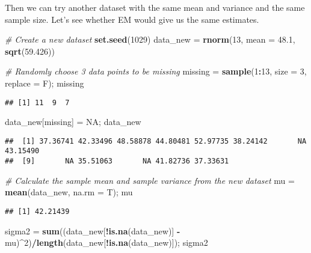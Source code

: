 \documentclass[]{article}
\newenvironment{Shaded}{\begin{snugshade}}{\end{snugshade}}
\newcommand{\CommentTok}[1]{\textcolor[rgb]{0.56,0.35,0.01}{\textit{#1}}}
\newcommand{\DataTypeTok}[1]{\textcolor[rgb]{0.13,0.29,0.53}{#1}}
\newcommand{\DecValTok}[1]{\textcolor[rgb]{0.00,0.00,0.81}{#1}}
\newcommand{\FloatTok}[1]{\textcolor[rgb]{0.00,0.00,0.81}{#1}}
\newcommand{\KeywordTok}[1]{\textcolor[rgb]{0.13,0.29,0.53}{\textbf{#1}}}
\newcommand{\NormalTok}[1]{#1}
\newcommand{\OperatorTok}[1]{\textcolor[rgb]{0.81,0.36,0.00}{\textbf{#1}}}
\newcommand{\OtherTok}[1]{\textcolor[rgb]{0.56,0.35,0.01}{#1}}
\newcommand{\StringTok}[1]{\textcolor[rgb]{0.31,0.60,0.02}{#1}}
\begin{document}
Then we can try another dataset with the same mean and variance and the
same sample size. Let's see whether EM would give us the same estimates.

\begin{Shaded}
\begin{Highlighting}[]
\CommentTok{# Create a new dataset}
\KeywordTok{set.seed}\NormalTok{(}\DecValTok{1029}\NormalTok{)}
\NormalTok{data_new =}\StringTok{ }\KeywordTok{rnorm}\NormalTok{(}\DecValTok{13}\NormalTok{, }\DataTypeTok{mean =} \FloatTok{48.1}\NormalTok{, }\KeywordTok{sqrt}\NormalTok{(}\FloatTok{59.426}\NormalTok{))}

\CommentTok{# Randomly choose 3 data points to be missing}
\NormalTok{missing =}\StringTok{ }\KeywordTok{sample}\NormalTok{(}\DecValTok{1}\OperatorTok{:}\DecValTok{13}\NormalTok{, }\DataTypeTok{size =} \DecValTok{3}\NormalTok{, }\DataTypeTok{replace =}\NormalTok{ F); missing}
\end{Highlighting}
\end{Shaded}

\begin{verbatim}
## [1] 11  9  7
\end{verbatim}

\begin{Shaded}
\begin{Highlighting}[]
\NormalTok{data_new[missing] =}\StringTok{ }\OtherTok{NA}\NormalTok{; data_new}
\end{Highlighting}
\end{Shaded}

\begin{verbatim}
##  [1] 37.36741 42.33496 48.58878 44.80481 52.97735 38.24142       NA 43.15490
##  [9]       NA 35.51063       NA 41.82736 37.33631
\end{verbatim}

\begin{Shaded}
\begin{Highlighting}[]
\CommentTok{# Calculate the sample mean and sample variance from the new dataset}
\NormalTok{mu =}\StringTok{ }\KeywordTok{mean}\NormalTok{(data_new, }\DataTypeTok{na.rm =}\NormalTok{ T); mu}
\end{Highlighting}
\end{Shaded}

\begin{verbatim}
## [1] 42.21439
\end{verbatim}

\begin{Shaded}
\begin{Highlighting}[]
\NormalTok{sigma2 =}\StringTok{ }\KeywordTok{sum}\NormalTok{((data_new[}\OperatorTok{!}\KeywordTok{is.na}\NormalTok{(data_new)] }\OperatorTok{-}\StringTok{ }\NormalTok{mu)}\OperatorTok{^}\DecValTok{2}\NormalTok{)}\OperatorTok{/}\KeywordTok{length}\NormalTok{(data_new[}\OperatorTok{!}\KeywordTok{is.na}\NormalTok{(data_new)]); sigma2}
\end{Highlighting}
\end{Shaded}
\end{document}
